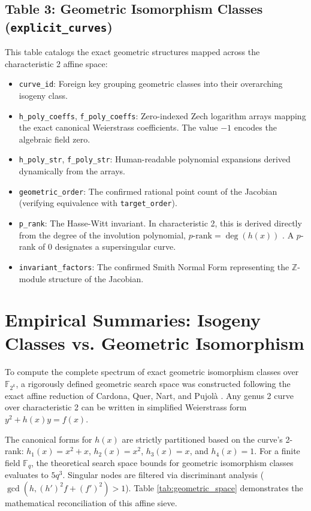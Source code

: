 \documentclass[letterpaper, 11pt]{article}
\begin{document}
	\subsection{Table 3: Geometric Isomorphism Classes (\texttt{explicit\_curves})}
	This table catalogs the exact geometric structures mapped across the characteristic 2 affine space:
	\begin{itemize}
		\item \texttt{curve\_id}: Foreign key grouping geometric classes into their overarching isogeny class.
		\item \texttt{h\_poly\_coeffs}, \texttt{f\_poly\_coeffs}: Zero-indexed Zech logarithm arrays mapping the exact canonical Weierstrass coefficients. The value $-1$ encodes the algebraic field zero.
		\item \texttt{h\_poly\_str}, \texttt{f\_poly\_str}: Human-readable polynomial expansions derived dynamically from the arrays.
		\item \texttt{geometric\_order}: The confirmed rational point count of the Jacobian (verifying equivalence with \texttt{target\_order}).
		\item \texttt{p\_rank}: The Hasse-Witt invariant. In characteristic 2, this is derived directly from the degree of the involution polynomial, $p\text{-rank} = \deg(h(x))$ \cite{Scholten2002}. A $p$-rank of 0 designates a supersingular curve.
		\item \texttt{invariant\_factors}: The confirmed Smith Normal Form representing the $\mathbb{Z}$-module structure of the Jacobian.
	\end{itemize}
	
	
	\section{Empirical Summaries: Isogeny Classes vs. Geometric Isomorphism}
	To compute the complete spectrum of exact geometric isomorphism classes over $\mathbb{F}_{2^k}$, a rigorously defined geometric search space was constructed following the exact affine reduction of Cardona, Quer, Nart, and Pujolà \cite{Cardona2005}. Any genus 2 curve over characteristic 2 can be written in simplified Weierstrass form $y^2 + h(x)y = f(x)$. 
	
	The canonical forms for $h(x)$ are strictly partitioned based on the curve's 2-rank: $h_1(x) = x^2 + x$, $h_2(x) = x^2$, $h_3(x) = x$, and $h_4(x) = 1$. For a finite field $\mathbb{F}_q$, the theoretical search space bounds for geometric isomorphism classes evaluates to $5q^3$. Singular nodes are filtered via discriminant analysis ($\gcd(h, (h')^2f + (f')^2) > 1$). Table \ref{tab:geometric_space} demonstrates the mathematical reconciliation of this affine sieve.
	
\end{document}
